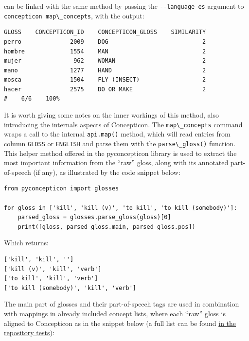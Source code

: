 \documentclass[
  a4paper,
  14pt,
  oneside,
  tablecaptionabove
]{scrbook}
\newcommand{\passthrough}[1]{#1}
\begin{document}
can be linked with the same method by passing the
\passthrough{\lstinline!--language es!} argument to
\passthrough{\lstinline!concepticon map\_concepts!}, with the output:

\begin{lstlisting}
GLOSS    CONCEPTICON_ID    CONCEPTICON_GLOSS    SIMILARITY
perro              2009    DOG                           2
hombre             1554    MAN                           2
mujer               962    WOMAN                         2
mano               1277    HAND                          2
mosca              1504    FLY (INSECT)                  2
hacer              2575    DO OR MAKE                    2
#    6/6    100%
\end{lstlisting}

It is worth giving some notes on the inner workings of this method, also
introducing the internals aspects of Concepticon. The
\passthrough{\lstinline!map\_concepts!} command wraps a call to the
internal \passthrough{\lstinline!api.map()!} method, which will read
entries from column \passthrough{\lstinline!GLOSS!} or
\passthrough{\lstinline!ENGLISH!} and parse them with the
\passthrough{\lstinline!parse\_gloss()!} function. This helper method
offered in the pyconcepticon library is used to extract the most
important information from the \enquote{raw} gloss, along with its
annotated part-of-speech (if any), as illustrated by the code snippet
below:

\begin{lstlisting}
from pyconcepticon import glosses

for gloss in ['kill', 'kill (v)', 'to kill', 'to kill (somebody)']:
    parsed_gloss = glosses.parse_gloss(gloss)[0]
    print([gloss, parsed_gloss.main, parsed_gloss.pos])
\end{lstlisting}

Which returns:

\begin{lstlisting}
['kill', 'kill', '']
['kill (v)', 'kill', 'verb']
['to kill', 'kill', 'verb']
['to kill (somebody)', 'kill', 'verb']
\end{lstlisting}

The main part of glosses and their part-of-speech tags are used in
combination with mappings in already included concept lists, where each
\enquote{raw} gloss is aligned to Concepticon as in the snippet below (a
full list can be found
\href{https://github.com/concepticon/pyconcepticon/blob/master/tests/fixtures/mappings/map-en.tsv}{in
the repository tests}):
\end{document}
